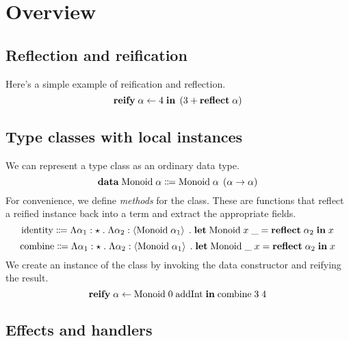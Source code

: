 \section{Overview}

  \subsection{Reflection and reification}

    Here's a simple example of reification and reflection.
    \[ \textbf{reify} \; \alpha \leftarrow 4 \; \textbf{in} \; \left( 3 + \textbf{reflect} \; \alpha \right) \]

  \subsection{Type classes with local instances}

    We can represent a type class as an ordinary data type.
    \[ \textbf{data} \; \text{Monoid} \; \alpha \Coloneqq \text{Monoid} \; \alpha \; \left( \alpha \rightarrow \alpha \right) \]
    For convenience, we define \emph{methods} for the class. These are functions that reflect a reified instance back into a term and extract the appropriate fields.
    \[ \text{identity} \Coloneqq \Lambda \alpha_1 : \star \; . \; \Lambda \alpha_2 : \left\langle \text{Monoid} \; \alpha_1 \right\rangle \; . \; \textbf{let} \; \text{Monoid} \; x \; \_ = \textbf{reflect} \; \alpha_2 \; \textbf{in} \; x \]
    \[ \text{combine} \Coloneqq \Lambda \alpha_1 : \star \; . \; \Lambda \alpha_2 : \left\langle \text{Monoid} \; \alpha_1 \right\rangle \; . \; \textbf{let} \; \text{Monoid} \; \_ \; x = \textbf{reflect} \; \alpha_2 \; \textbf{in} \; x \]
    We create an instance of the class by invoking the data constructor and reifying the result.
    \[ \textbf{reify} \; \alpha \leftarrow \text{Monoid} \; 0 \; \text{addInt} \; \textbf{in} \; \text{combine} \; 3 \; 4 \]

  \subsection{Effects and handlers}
